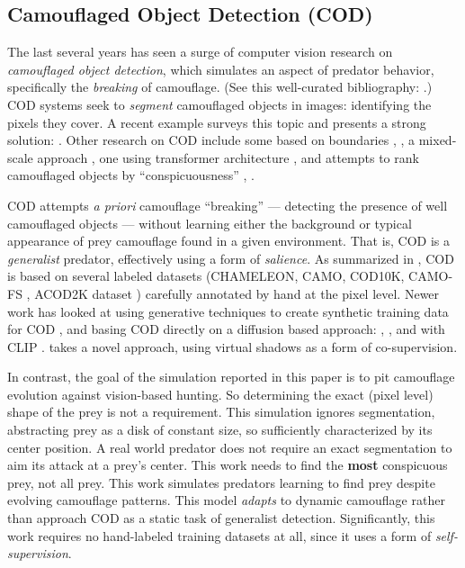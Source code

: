 \documentclass[letterpaper]{article}
\newcommand{\jargon}[1]{\textit{#1}}
\begin{document}
\subsection{Camouflaged Object Detection (COD)}
The last several years has seen a surge of computer vision research on \jargon{camouflaged object detection}, which simulates an aspect of predator behavior, specifically the \textit{breaking} of camouflage. (See this well-curated bibliography: \citet{visionxiang_cod}.) COD systems seek to \jargon{segment} camouflaged objects in images: identifying the pixels they cover. A recent example surveys this topic and presents a strong solution: \citet{Zhang2022}. Other research on COD include some based on boundaries \citep{chen_boundary-guided_2022}, \citep{sun_boundary-guided_2022}, a mixed-scale approach \citep{pang_zoom_2022}, one using transformer architecture \citep{yin_camoformer_2022}, and attempts to rank camouflaged objects by “conspicuousness” \citep{lv_cod_2022}, \citep{volonakis_camouflage_2018}.
\par
COD attempts \textit{a priori} camouflage “breaking” --- detecting the presence of well camouflaged objects --- without learning either the background or typical appearance of prey camouflage found in a given environment. That is, COD is a \jargon{generalist} predator, effectively using a form of \jargon{salience}. As summarized in \citet{Zhang2022}, COD is based on several labeled datasets (CHAMELEON, CAMO, COD10K, CAMO-FS \citep{nguyen_few-shot_2023}, ACOD2K dataset \citep{song_camouflaged_2023}) carefully annotated by hand at the pixel level. Newer work has looked at using generative techniques to create synthetic training data for COD \citep{zhang_camouflaged_2023}, and basing COD directly on a diffusion based approach: \citep{chen_diffusion_2023}, \citep{chen_camodiffusion_2023}, and with CLIP \citep{vu_leveraging_2023}. \citet{hu_shifting_2024} takes a novel approach, using virtual shadows as a form of co-supervision.
\par
In contrast, the goal of the simulation reported in this paper is to pit camouflage evolution against vision-based hunting. So determining the exact (pixel level) shape of the prey is not a requirement. This simulation ignores segmentation, abstracting prey as a disk of constant size, so sufficiently characterized by its center position. A real world predator does not require an exact segmentation to aim its attack at a prey's center. This work needs to find the \textbf{most} conspicuous prey, not all prey. This work simulates predators learning to find prey despite evolving camouflage patterns. This model \jargon{adapts} to dynamic camouflage rather than approach COD as a static task of generalist detection. Significantly, this work requires no hand-labeled training datasets at all, since it uses a form of \jargon{self-supervision}.
\par
\end{document}
